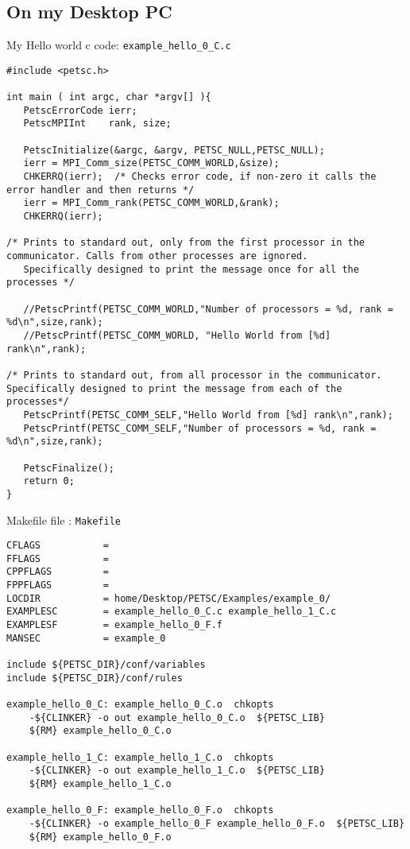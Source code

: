 \documentclass{article}
\begin{document}
\subsection{On my Desktop PC}
My Hello world c code:  \verb+example_hello_0_C.c+ 
\begin{scriptsize}\begin{verbatim}
#include <petsc.h>

int main ( int argc, char *argv[] ){
   PetscErrorCode ierr;
   PetscMPIInt    rank, size;
   
   PetscInitialize(&argc, &argv, PETSC_NULL,PETSC_NULL);
   ierr = MPI_Comm_size(PETSC_COMM_WORLD,&size);
   CHKERRQ(ierr);  /* Checks error code, if non-zero it calls the error handler and then returns */
   ierr = MPI_Comm_rank(PETSC_COMM_WORLD,&rank);
   CHKERRQ(ierr);

/* Prints to standard out, only from the first processor in the communicator. Calls from other processes are ignored.
   Specifically designed to print the message once for all the processes */
   
   //PetscPrintf(PETSC_COMM_WORLD,"Number of processors = %d, rank = %d\n",size,rank);
   //PetscPrintf(PETSC_COMM_WORLD, "Hello World from [%d] rank\n",rank); 

/* Prints to standard out, from all processor in the communicator. Specifically designed to print the message from each of the processes*/ 
   PetscPrintf(PETSC_COMM_SELF,"Hello World from [%d] rank\n",rank);  
   PetscPrintf(PETSC_COMM_SELF,"Number of processors = %d, rank = %d\n",size,rank);

   PetscFinalize();
   return 0;
}
\end{verbatim}\end{scriptsize}
Makefile file : \verb+Makefile+
\begin{scriptsize}\begin{verbatim}
CFLAGS	         = 
FFLAGS	         = 
CPPFLAGS         = 
FPPFLAGS         =
LOCDIR           = home/Desktop/PETSC/Examples/example_0/
EXAMPLESC        = example_hello_0_C.c example_hello_1_C.c 
EXAMPLESF        = example_hello_0_F.f 
MANSEC           = example_0

include ${PETSC_DIR}/conf/variables
include ${PETSC_DIR}/conf/rules

example_hello_0_C: example_hello_0_C.o  chkopts
	-${CLINKER} -o out example_hello_0_C.o  ${PETSC_LIB}
	${RM} example_hello_0_C.o

example_hello_1_C: example_hello_1_C.o  chkopts
	-${CLINKER} -o out example_hello_1_C.o  ${PETSC_LIB}
	${RM} example_hello_1_C.o

example_hello_0_F: example_hello_0_F.o  chkopts
	-${CLINKER} -o example_hello_0_F example_hello_0_F.o  ${PETSC_LIB}
	${RM} example_hello_0_F.o
\end{verbatim}\end{scriptsize}
\end{document}
